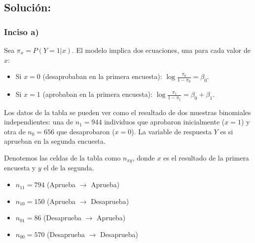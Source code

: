 \documentclass[paper=letter, fontsize=11pt, draft=false]{scrartcl}\usepackage[]{graphicx}\usepackage[]{xcolor}
\numberwithin{equation}{problemcounter} %
\numberwithin{figure}{problemcounter} %
\numberwithin{table}{problemcounter} %
\numberwithin{subsection}{problemcounter}
\begin{document}
\subsection{\textbf{Solución:}}

\subsubsection*{Inciso a)}

Sea $\pi_x = P(Y=1|x)$. El modelo implica dos ecuaciones, una para cada valor de $x$:
\begin{itemize}
    \item Si $x=0$ (desaprobaban en la primera encuesta): $\log \frac{\pi_0}{1-\pi_0} = \beta_0$.
    \item Si $x=1$ (aprobaban en la primera encuesta): $\log \frac{\pi_1}{1-\pi_1} = \beta_0 + \beta_1$.
\end{itemize}

Los datos de la tabla se pueden ver como el resultado de dos muestras binomiales independientes: una de $n_1=944$ individuos que aprobaron inicialmente ($x=1$) y otra de $n_0=656$ que desaprobaron ($x=0$). La variable de respuesta $Y$ es si aprueban en la segunda encuesta.

Denotemos las celdas de la tabla como $n_{xy}$, donde $x$ es el resultado de la primera encuesta y $y$ el de la segunda.
\begin{itemize}
    \item $n_{11} = 794$ (Aprueba $\rightarrow$ Aprueba)
    \item $n_{10} = 150$ (Aprueba $\rightarrow$ Desaprueba)
    \item $n_{01} = 86$ (Desaprueba $\rightarrow$ Aprueba)
    \item $n_{00} = 570$ (Desaprueba $\rightarrow$ Desaprueba)
\end{itemize}
\end{document}

